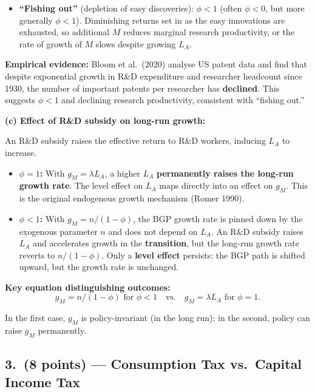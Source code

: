 \documentclass[a4paper,11pt]{article}
\begin{document}
\begin{answerbox}
\begin{itemize}
    \item \textbf{``Fishing out''} (depletion of easy discoveries): $\phi < 1$ (often $\phi < 0$, but more generally $\phi < 1$). Diminishing returns set in as the easy innovations are exhausted, so additional $M$ reduces marginal research productivity, or the rate of growth of $M$ slows despite growing $L_A$.
\end{itemize}

\textbf{Empirical evidence:} Bloom et al.\ (2020) analyse US patent data and find that despite exponential growth in R\&D expenditure and researcher headcount since 1930, the number of important patents per researcher has \textbf{declined}. This suggests $\phi < 1$ and declining research productivity, consistent with ``fishing out.''

\textbf{(c) Effect of R\&D subsidy on long-run growth:}

An R\&D subsidy raises the effective return to R\&D workers, inducing $L_A$ to increase.

\begin{itemize}
    \item \textbf{$\phi = 1$:} With $g_M = \lambda L_A$, a higher $L_A$ \textbf{permanently raises the long-run growth rate}. The level effect on $L_A$ maps directly into an effect on $g_M$. This is the original endogenous growth mechanism (Romer 1990).

    \item \textbf{$\phi < 1$:} With $g_M = n/(1-\phi)$, the BGP growth rate is pinned down by the exogenous parameter $n$ and does not depend on $L_A$. An R\&D subsidy raises $L_A$ and accelerates growth in the \textbf{transition}, but the long-run growth rate reverts to $n/(1-\phi)$. Only a \textbf{level effect} persists: the BGP path is shifted upward, but the growth rate is unchanged.
\end{itemize}

\textbf{Key equation distinguishing outcomes:}
\[
    \boxed{g_M = n/(1-\phi) \text{ for } \phi < 1 \quad\text{vs.}\quad g_M = \lambda L_A \text{ for } \phi=1.}
\]

In the first case, $g_M$ is policy-invariant (in the long run); in the second, policy can raise $g_M$ permanently.
\end{answerbox}

\subsection*{3.\ (8 points) --- Consumption Tax vs.\ Capital Income Tax}
\end{document}
